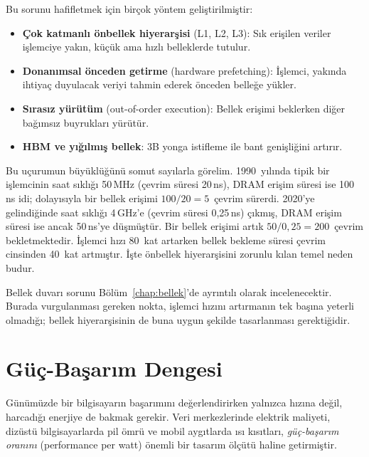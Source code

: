 Bu sorunu hafifletmek için birçok yöntem geliştirilmiştir:
\begin{itemize}
    \item \textbf{Çok katmanlı önbellek hiyerarşisi} (L1, L2, L3): Sık erişilen veriler işlemciye yakın, küçük ama hızlı belleklerde tutulur.
    \item \textbf{Donanımsal önceden getirme} (hardware prefetching): İşlemci, yakında ihtiyaç duyulacak veriyi tahmin ederek önceden belleğe yükler.
    \item \textbf{Sırasız yürütüm} (out-of-order execution): Bellek erişimi beklerken diğer bağımsız buyrukları yürütür.
    \item \textbf{HBM ve yığılmış bellek}: 3B yonga istifleme ile bant genişliğini artırır.
\end{itemize}

Bu uçurumun büyüklüğünü somut sayılarla görelim. 1990~yılında tipik bir işlemcinin saat sıklığı 50\,MHz (çevrim süresi 20\,ns), DRAM erişim süresi ise 100\,ns idi; dolayısıyla bir bellek erişimi $100/20 = 5$~çevrim sürerdi. 2020'ye gelindiğinde saat sıklığı 4\,GHz'e (çevrim süresi 0,25\,ns) çıkmış, DRAM erişim süresi ise ancak 50\,ns'ye düşmüştür. Bir bellek erişimi artık $50/0{,}25 = 200$~çevrim bekletmektedir. İşlemci hızı 80~kat artarken bellek bekleme süresi çevrim cinsinden 40~kat artmıştır. İşte önbellek hiyerarşisini zorunlu kılan temel neden budur.

Bellek duvarı sorunu Bölüm~\ref{chap:bellek}'de ayrıntılı olarak incelenecektir. Burada vurgulanması gereken nokta, işlemci hızını artırmanın tek başına yeterli olmadığı; bellek hiyerarşisinin de buna uygun şekilde tasarlanması gerektiğidir.


\section{Güç-Başarım Dengesi}
\label{sec:guc-basarim}

Günümüzde bir bilgisayarın başarımını değerlendirirken yalnızca hızına değil, harcadığı enerjiye de bakmak gerekir. Veri merkezlerinde elektrik maliyeti, dizüstü bilgisayarlarda pil ömrü ve mobil aygıtlarda ısı kısıtları, \emph{güç-başarım oranını} (performance per watt) önemli bir tasarım ölçütü haline getirmiştir.

